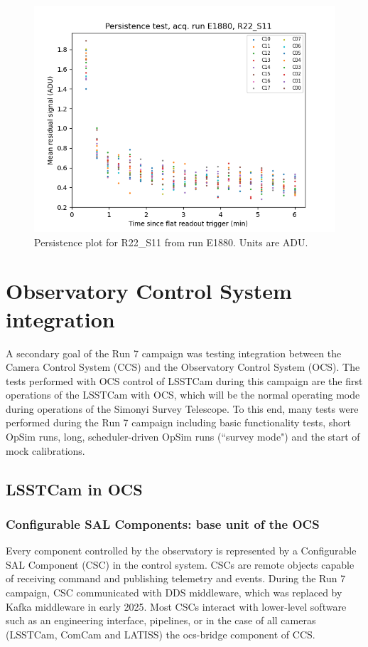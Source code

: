 \begin{figure}
    \centering
    \includegraphics[width=0.8\linewidth]{figures/ReferenceFigures/persistence_plot_LSSTCam_R22_S11_u_lsstccs_eo_persistence_E1880_w_2024_35_20241101T020526Z.png}
    \caption{Persistence plot for R22\_S11 from run E1880.  Units are ADU.}
    \label{fig:ref:persistence}
\end{figure}

\clearpage
\section{Observatory Control System integration}
A secondary goal of the Run 7 campaign was testing integration between the Camera Control System (CCS) and the Observatory Control System (OCS). The tests performed with OCS control of LSSTCam during this campaign are the first operations of the LSSTCam with OCS, which will be the normal operating mode during operations of the Simonyi Survey Telescope. To this end, many tests were performed during the Run 7 campaign including basic functionality tests, short OpSim runs, long, scheduler-driven OpSim runs (``survey mode") and the start of mock calibrations.

\subsection{LSSTCam in OCS}
\subsubsection{Configurable SAL Components:  base unit of the OCS}

Every component controlled by the observatory is represented by a Configurable SAL Component (CSC) in the control system. CSCs are remote objects capable of receiving command and publishing telemetry and events. During the Run 7 campaign, CSC communicated with DDS middleware, which was replaced by Kafka middleware in early 2025. Most CSCs interact with lower-level software such as an engineering interface, pipelines, or in the case of all cameras (LSSTCam, ComCam and LATISS) the ocs-bridge component of CCS.

